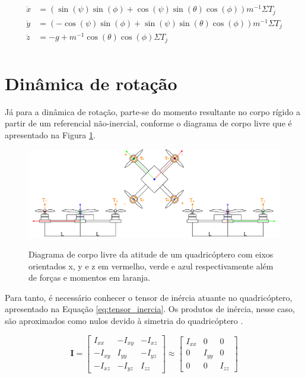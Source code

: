 \documentclass[main.tex]{subfiles}
\begin{document}
\begin{equation}\label{eq:dinamica_translacao}
    \begin{split}
        \ddot{x} &= (\sin{(\psi)}\sin{(\phi)} + \cos{(\psi)}\sin{(\theta)}\cos{(\phi)})m^{-1}\Sigma T_j\\
        \ddot{y} &= (-\cos{(\psi)}\sin{(\phi)} + \sin{(\psi)}\sin{(\theta)}\cos{(\phi)})m^{-1}\Sigma T_j\\
        \ddot{z} &= -g + m^{-1}\cos{(\theta)}\cos{(\phi)}\Sigma T_j\\
    \end{split}
\end{equation}

\section{Dinâmica de rotação}

Já para a dinâmica de rotação, parte-se do momento resultante no corpo rígido a partir de um referencial não-inercial, conforme o diagrama de corpo livre que é apresentado na Figura \ref{fig:attitude_dcl}.

\begin{figure}[!h]
	\centering
	\caption{Diagrama de corpo livre da atitude de um quadricóptero com eixos orientados x, y e z em vermelho, verde e azul respectivamente além de forças e momentos em laranja.}
	\includegraphics[width=1\textwidth]{capitulos/modelagem/imgs/attitude_dcl.png}
	\label{fig:attitude_dcl}
\end{figure}

Para tanto, é necessário conhecer o tensor de inércia atuante no quadricóptero, apresentado na Equação \ref{eq:tensor_inercia}. Os produtos de inércia, nesse caso, são aproximados como nulos devido à simetria do quadricóptero \cite{justificativa_inercia}.

\begin{equation}\label{eq:tensor_inercia}
	\boldsymbol{I} = \begin{bmatrix}
		I_{xx} & -I_{xy} & -I_{xz}\\
		-I_{xy} &  I_{yy} & -I_{yz}\\
		-I_{xz} & -I_{yz} & I_{zz}
	\end{bmatrix} \approx \begin{bmatrix}
	I_{xx} 	& 0 		& 0\\
	0 		&  I_{yy} 	& 0\\
	0 		& 0 		& I_{zz}
	\end{bmatrix}
\end{equation}
\end{document}
